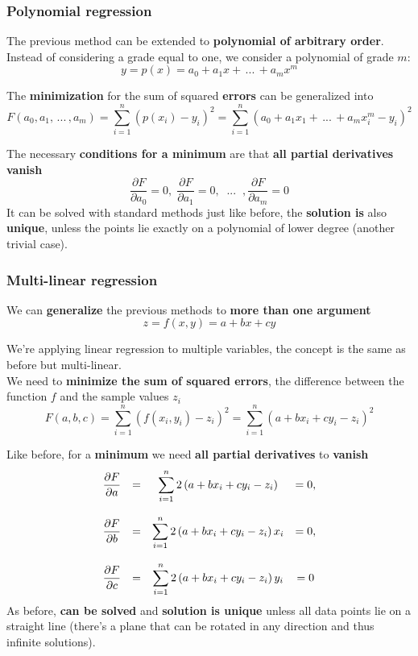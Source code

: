 \documentclass[11pt]{article}
\begin{document}
		\newpage
		
		\subsubsection{Polynomial regression}
		The previous method can be extended to \textbf{polynomial of arbitrary order}. Instead of considering a grade equal to one, we consider a polynomial of grade $m$: 
		$$ y = p(x) = a_0 + a_1 x + \, ... \, + a_m x^m $$
		
		The \textbf{minimization} for the sum of squared \textbf{errors} can be generalized into
		$$ F(a_0, a_1, \, ... \, , a_m) = \sum_{i=1}^n \left(p(x_i) - y_i\right)^2 = \sum_{i=1}^n (a_0 + a_1 x_1 + \, ... \, + a_m x_i^m - y_i)^2 $$
		
		The necessary \textbf{conditions for a minimum} are that \textbf{all partial derivatives vanish}
		$$ \frac{\partial F}{\partial a_0} = 0, \; \frac{\partial F}{\partial a_1} = 0, \;\; ... \;\; , \frac{\partial F}{\partial a_m} = 0 $$
		It can be solved with standard methods just like before, the \textbf{solution is} also \textbf{unique}, unless the points lie exactly on a polynomial of lower degree (another trivial case).\\
		
		\newpage
		
		\subsubsection{Multi-linear regression}
		We can \textbf{generalize} the previous methods to \textbf{more than one argument}
		$$ z = f(x,y) = a + bx + cy $$
		
		We're applying linear regression to multiple variables, the concept is the same as before but multi-linear.\\
		
		We need to \textbf{minimize the sum of squared errors}, the difference between the function $f$ and the sample values $z_i$
		$$ F(a,b,c) = \sum_{i=1}^n \left(f (x_i, y_i) - z_i \right)^2 = \sum_{i=1}^n \left(a + b x_i + c y_i - z_i \right)^2 $$
		
		Like before, for a \textbf{minimum} we need \textbf{all partial derivatives} to \textbf{vanish}
		$$ \begin{array}{c c c c}
			\displaystyle \frac{\partial F}{\partial a} & = & \displaystyle \sum_{i=1}^n 2 \left(a + b x_i + c y_i - z_i \right) & = 0, \\
			\hfill \\
			\displaystyle \frac{\partial F}{\partial b} & = & \displaystyle \sum_{i=1}^n 2 \left(a + b x_i + c y_i - z_i \right)x_i & = 0, \\
			\hfill \\
			\displaystyle \frac{\partial F}{\partial c} & = & \displaystyle \sum_{i=1}^n 2 \left(a + b x_i + c y_i - z_i \right)y_i & = 0
		\end{array} $$
		As before, \textbf{can be solved} and \textbf{solution is unique} unless all data points lie on a straight line (there's a plane that can be rotated in any direction and thus infinite solutions).\\
		
\end{document}
